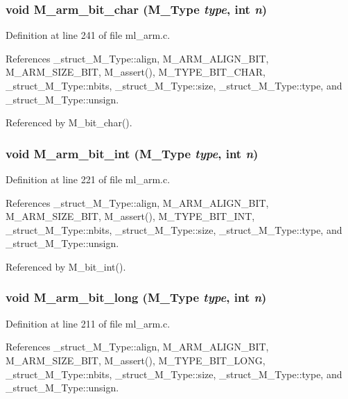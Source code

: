 \subsubsection{\setlength{\rightskip}{0pt plus 5cm}void M\_\-arm\_\-bit\_\-char (\bf{M\_\-Type} {\em type}, int {\em n})}\label{m__arm_8h_dae20b3632fbb5d3b9b4ead23adf8fd5}




Definition at line 241 of file ml\_\-arm.c.

References \_\-struct\_\-M\_\-Type::align, M\_\-ARM\_\-ALIGN\_\-BIT, M\_\-ARM\_\-SIZE\_\-BIT, M\_\-assert(), M\_\-TYPE\_\-BIT\_\-CHAR, \_\-struct\_\-M\_\-Type::nbits, \_\-struct\_\-M\_\-Type::size, \_\-struct\_\-M\_\-Type::type, and \_\-struct\_\-M\_\-Type::unsign.

Referenced by M\_\-bit\_\-char().
\subsubsection{\setlength{\rightskip}{0pt plus 5cm}void M\_\-arm\_\-bit\_\-int (\bf{M\_\-Type} {\em type}, int {\em n})}\label{m__arm_8h_59b2f811f2897305c9fda06e3b30c9a7}




Definition at line 221 of file ml\_\-arm.c.

References \_\-struct\_\-M\_\-Type::align, M\_\-ARM\_\-ALIGN\_\-BIT, M\_\-ARM\_\-SIZE\_\-BIT, M\_\-assert(), M\_\-TYPE\_\-BIT\_\-INT, \_\-struct\_\-M\_\-Type::nbits, \_\-struct\_\-M\_\-Type::size, \_\-struct\_\-M\_\-Type::type, and \_\-struct\_\-M\_\-Type::unsign.

Referenced by M\_\-bit\_\-int().
\subsubsection{\setlength{\rightskip}{0pt plus 5cm}void M\_\-arm\_\-bit\_\-long (\bf{M\_\-Type} {\em type}, int {\em n})}\label{m__arm_8h_777a9ef47b52fc1c01340408ddc629cb}




Definition at line 211 of file ml\_\-arm.c.

References \_\-struct\_\-M\_\-Type::align, M\_\-ARM\_\-ALIGN\_\-BIT, M\_\-ARM\_\-SIZE\_\-BIT, M\_\-assert(), M\_\-TYPE\_\-BIT\_\-LONG, \_\-struct\_\-M\_\-Type::nbits, \_\-struct\_\-M\_\-Type::size, \_\-struct\_\-M\_\-Type::type, and \_\-struct\_\-M\_\-Type::unsign.


